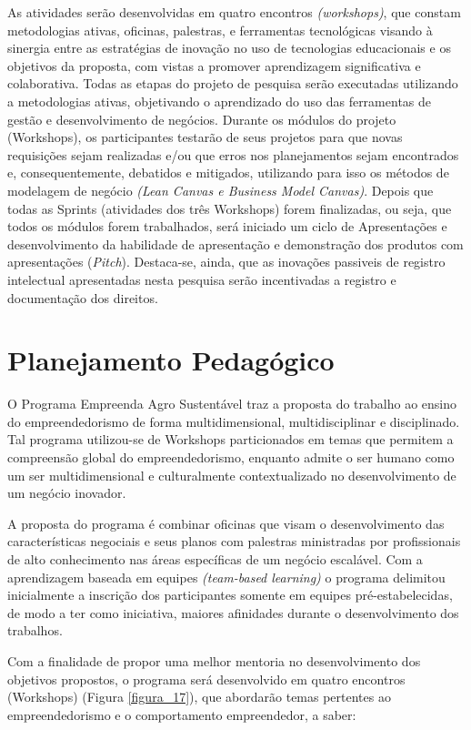 As atividades serão desenvolvidas em quatro encontros \textit{(workshops)}, que constam metodologias ativas, oficinas, palestras, e ferramentas tecnológicas visando à sinergia entre as estratégias de inovação no uso de tecnologias educacionais e os objetivos da proposta, com vistas a promover aprendizagem significativa e colaborativa. Todas as etapas do projeto de pesquisa serão executadas utilizando a metodologias ativas, objetivando o aprendizado do uso das ferramentas de gestão e desenvolvimento de negócios.
Durante os módulos do projeto (Workshops), os participantes testarão de seus projetos para que novas requisições sejam realizadas e/ou que erros nos planejamentos sejam encontrados e, consequentemente, debatidos e mitigados, utilizando para isso os métodos de modelagem de negócio \textit{(Lean Canvas e Business Model Canvas)}. Depois que todas as Sprints (atividades dos três Workshops) forem finalizadas, ou seja, que todos os módulos forem trabalhados, será iniciado um ciclo de Apresentações e desenvolvimento da habilidade de apresentação e demonstração dos produtos com apresentações (\textit{Pitch}). Destaca-se, ainda, que as inovações passiveis de registro intelectual apresentadas nesta pesquisa serão incentivadas a registro e documentação dos direitos.



\section{Planejamento Pedagógico}

O Programa Empreenda Agro Sustentável traz a proposta do trabalho ao ensino do empreendedorismo de forma multidimensional, multidisciplinar e disciplinado. Tal programa utilizou-se de Workshops particionados em temas que permitem a compreensão global do empreendedorismo, enquanto admite o ser humano como um ser multidimensional e culturalmente contextualizado no desenvolvimento de um negócio inovador. 

A proposta do programa é combinar oficinas que visam o desenvolvimento das características negociais e seus planos com palestras ministradas por profissionais de alto conhecimento nas áreas específicas de um negócio escalável. Com a aprendizagem baseada em equipes \textit{(team-based learning)} o programa delimitou inicialmente a inscrição dos participantes somente em equipes pré-estabelecidas, de modo a ter como iniciativa, maiores afinidades durante o desenvolvimento dos trabalhos. 


Com a finalidade de propor uma melhor mentoria no desenvolvimento dos objetivos propostos, o programa será desenvolvido em quatro encontros (Workshops) (Figura \ref{figura_17}), que abordarão temas pertentes ao empreendedorismo e o comportamento empreendedor, a saber:

